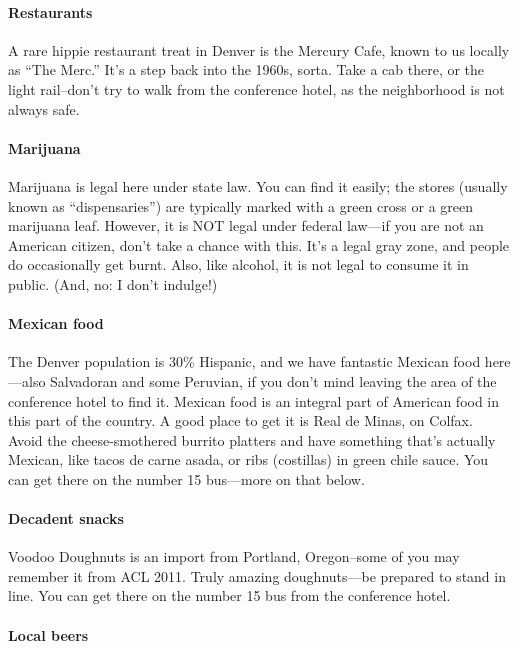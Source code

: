 \paragraph{Restaurants}

A rare hippie restaurant treat in Denver is the Mercury Cafe, known to us locally as “The Merc.”  It's a step back into the 1960s, sorta.  Take a cab there, or the light rail–don't try to walk from the conference hotel, as the neighborhood is not always safe.

\paragraph{Marijuana}

Marijuana is legal here under state law. You can find it easily; the
stores (usually known as “dispensaries”) are typically marked with a
green cross or a green marijuana leaf. However, it is NOT legal under
federal law---if you are not an American citizen, don't take a chance
with this. It's a legal gray zone, and people do occasionally get
burnt. Also, like alcohol, it is not legal to consume it in public.
(And, no: I don't indulge!)

\paragraph{Mexican food}

The Denver population is 30\% Hispanic, and we have fantastic Mexican
food here---also Salvadoran and some Peruvian, if you don't mind
leaving the area of the conference hotel to find it. Mexican food is
an integral part of American food in this part of the country. A good
place to get it is Real de Minas, on Colfax. Avoid the
cheese-smothered burrito platters and have something that's actually
Mexican, like tacos de carne asada, or ribs (costillas) in green chile
sauce. You can get there on the number 15 bus---more on that below.

\paragraph{Decadent snacks}

Voodoo Doughnuts is an import from Portland, Oregon–some of you may
remember it from ACL 2011. Truly amazing doughnuts---be prepared to
stand in line. You can get there on the number 15 bus from the
conference hotel.

\paragraph{Local beers}

